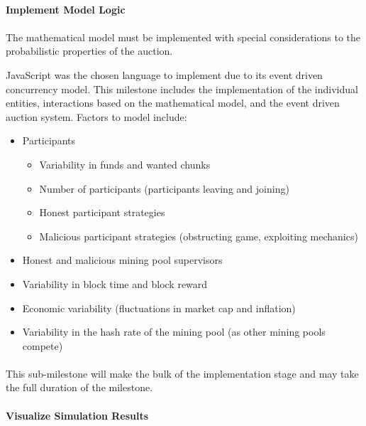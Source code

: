 \paragraph{Implement Model Logic}

\paragraph{} The mathematical model must be implemented with special considerations to the probabilistic properties of the auction.  JavaScript was the chosen language to implement due to its event driven concurrency model. This milestone includes the implementation of the individual entities, interactions based on the mathematical model, and the event driven auction system. Factors to model include:

\begin{itemize}
  \item Participants
    \begin{itemize}
      \item Variability in funds and wanted chunks
      \item Number of participants (participants leaving and joining)
      \item Honest participant strategies
      \item Malicious participant strategies (obstructing game, exploiting mechanics)
    \end{itemize}
  \item Honest and malicious mining pool supervisors
  \item Variability in block time and block reward
  \item Economic variability (fluctuations in market cap and inflation)
  \item Variability in the hash rate of the mining pool (as other mining pools compete)
\end{itemize}

\paragraph{} This sub-milestone will make the bulk of the implementation stage and may take the full duration of the milestone.

\paragraph{Visualize Simulation Results}

